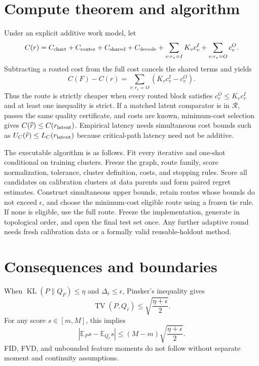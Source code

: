 \documentclass[11pt]{article}
\DeclareMathOperator{\KL}{KL}
\DeclareMathOperator{\TV}{TV}
\newcommand{\E}{\mathbb E}
\newcommand{\cR}{\mathcal R}
\begin{document}
\section{Compute theorem and algorithm}

Under an explicit additive work model, let
\begin{equation}
 C(r)=C_{\rm chart}+C_{\rm router}+C_{\rm shared}+C_{\rm decode}
 +\sum_{v:r_v=I}K_vc_v^I+\sum_{v:r_v=O}c_v^O.
 \label{eq:cost}
\end{equation}
Subtracting a routed cost from the full cost cancels the shared terms and yields
\begin{equation}
 C(F)-C(r)=\sum_{v:r_v=O}(K_vc_v^I-c_v^O).
 \label{eq:saving}
\end{equation}
Thus the route is strictly cheaper when every routed block satisfies $c_v^O\le K_vc_v^I$ and at least one inequality is strict.  If a matched latent comparator is in $\cR$, passes the same quality certificate, and costs are known, minimum-cost selection gives $C(\widehat r)\le C(r_{\rm latent})$.  Empirical latency needs simultaneous cost bounds such as $U_C(\widehat r)\le L_C(r_{\rm latent})$ because critical-path latency need not be additive.

The executable algorithm is as follows.  Fit every iterative and one-shot conditional on training clusters.  Freeze the graph, route family, score normalization, tolerance, cluster definition, costs, and stopping rules.  Score all candidates on calibration clusters at data parents and form paired regret estimates.  Construct simultaneous upper bounds, retain routes whose bounds do not exceed $\epsilon$, and choose the minimum-cost eligible route using a frozen tie rule.  If none is eligible, use the full route.  Freeze the implementation, generate in topological order, and open the final test set once.  Any further adaptive round needs fresh calibration data or a formally valid reusable-holdout method.

\section{Consequences and boundaries}

When $\KL(P\|Q_F)\le\eta$ and $\Delta_{\widehat r}\le\epsilon$, Pinsker's inequality gives
\begin{equation}
 \TV(P,Q_{\widehat r})\le\sqrt{\frac{\eta+\epsilon}{2}}.
\end{equation}
For any score $s\in[m,M]$, this implies
\begin{equation}
 \left|\E_Ps-\E_{Q_{\widehat r}}s\right|
 \le(M-m)\sqrt{\frac{\eta+\epsilon}{2}}.
\end{equation}
FID, FVD, and unbounded feature moments do not follow without separate moment and continuity assumptions.
\end{document}
